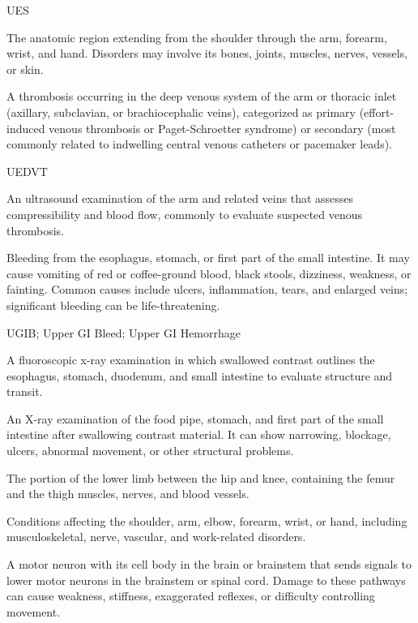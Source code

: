\synonyms
UES

 The anatomic region extending from the shoulder through the arm, forearm, wrist, and hand. Disorders may involve its bones, joints, muscles, nerves, vessels, or skin.

 A thrombosis occurring in the deep venous system of the arm or thoracic inlet (axillary, subclavian, or brachiocephalic veins), categorized as primary (effort-induced venous thrombosis or Paget-Schroetter syndrome) or secondary (most commonly related to indwelling central venous catheters or pacemaker leads).

\synonyms
UEDVT

 An ultrasound examination of the arm and related veins that assesses compressibility and blood flow, commonly to evaluate suspected venous thrombosis.

 Bleeding from the esophagus, stomach, or first part of the small intestine. It may cause vomiting of red or coffee-ground blood, black stools, dizziness, weakness, or fainting. Common causes include ulcers, inflammation, tears, and enlarged veins; significant bleeding can be life-threatening.

\synonyms
UGIB; Upper GI Bleed; Upper GI Hemorrhage

 A fluoroscopic x-ray examination in which swallowed contrast outlines the esophagus, stomach, duodenum, and small intestine to evaluate structure and transit.

 An X-ray examination of the food pipe, stomach, and first part of the small intestine after swallowing contrast material. It can show narrowing, blockage, ulcers, abnormal movement, or other structural problems.

 The portion of the lower limb between the hip and knee, containing the femur and the thigh muscles, nerves, and blood vessels.

 Conditions affecting the shoulder, arm, elbow, forearm, wrist, or hand, including musculoskeletal, nerve, vascular, and work-related disorders.

 A motor neuron with its cell body in the brain or brainstem that sends signals to lower motor neurons in the brainstem or spinal cord. Damage to these pathways can cause weakness, stiffness, exaggerated reflexes, or difficulty controlling movement.

